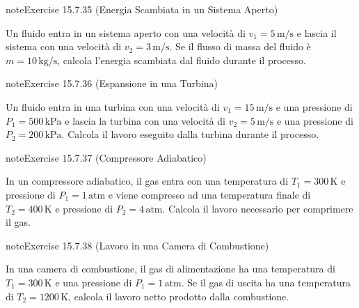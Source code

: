 \documentclass[letterpaper,10pt,italian]{jupyterBook}
\begin{document}
\begin{sphinxadmonition}{note}{Exercise 15.7.35 (Energia Scambiata in un Sistema Aperto)}



\sphinxAtStartPar
Un fluido entra in un sistema aperto con una velocità di \(v_1 = 5 \, \text{m/s}\) e lascia il sistema con una velocità di \(v_2 = 3 \, \text{m/s}\). Se il flusso di massa del fluido è \(m = 10 \, \text{kg/s}\), calcola l’energia scambiata dal fluido durante il processo.
\end{sphinxadmonition}
 \label{exercise:ch/thermodynamics/principles-problems-exercise-35}

\begin{sphinxadmonition}{note}{Exercise 15.7.36 (Espansione in una Turbina)}



\sphinxAtStartPar
Un fluido entra in una turbina con una velocità di \(v_1 = 15 \, \text{m/s}\) e una pressione di \(P_1 = 500 \, \text{kPa}\) e lascia la turbina con una velocità di \(v_2 = 5 \, \text{m/s}\) e una pressione di \(P_2 = 200 \, \text{kPa}\). Calcola il lavoro eseguito dalla turbina durante il processo.
\end{sphinxadmonition}
 \label{exercise:ch/thermodynamics/principles-problems-exercise-36}

\begin{sphinxadmonition}{note}{Exercise 15.7.37 (Compressore Adiabatico)}



\sphinxAtStartPar
In un compressore adiabatico, il gas entra con una temperatura di \(T_1 = 300 \, \text{K}\) e pressione di \(P_1 = 1 \, \text{atm}\) e viene compresso ad una temperatura finale di \(T_2 = 400 \, \text{K}\) e pressione di \(P_2 = 4 \, \text{atm}\). Calcola il lavoro necessario per comprimere il gas.
\end{sphinxadmonition}
 \label{exercise:ch/thermodynamics/principles-problems-exercise-37}

\begin{sphinxadmonition}{note}{Exercise 15.7.38 (Lavoro in una Camera di Combustione)}



\sphinxAtStartPar
In una camera di combustione, il gas di alimentazione ha una temperatura di \(T_1 = 300 \, \text{K}\) e una pressione di \(P_1 = 1 \, \text{atm}\). Se il gas di uscita ha una temperatura di \(T_2 = 1200 \, \text{K}\), calcola il lavoro netto prodotto dalla combustione.
\end{sphinxadmonition}
 \label{exercise:ch/thermodynamics/principles-problems-exercise-38}
\end{document}
